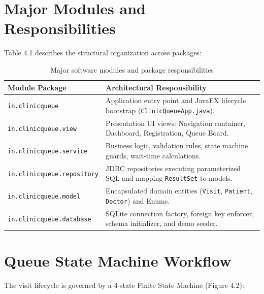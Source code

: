 \documentclass[12pt,a4paper,oneside]{report}
\begin{document}
\section{Major Modules and Responsibilities}
Table 4.1 describes the structural organization across packages:

\begin{table}[H]
\centering
\small
\begin{tabularx}{\textwidth}{p{3.2cm} X}
\toprule
\textbf{Module Package} & \textbf{Architectural Responsibility} \\
\midrule
\texttt{in.clinicqueue} & Application entry point and JavaFX lifecycle bootstrap (\texttt{ClinicQueueApp.java}). \\
\texttt{in.clinicqueue.view} & Presentation UI views: Navigation container, Dashboard, Registration, Queue Board. \\
\texttt{in.clinicqueue.service} & Business logic, validation rules, state machine guards, wait-time calculations. \\
\texttt{in.clinicqueue.repository} & JDBC repositories executing parameterized SQL and mapping \texttt{ResultSet} to models. \\
\texttt{in.clinicqueue.model} & Encapsulated domain entities (\texttt{Visit}, \texttt{Patient}, \texttt{Doctor}) and Enums. \\
\texttt{in.clinicqueue.database} & SQLite connection factory, foreign key enforcer, schema initializer, and demo seeder. \\
\bottomrule
\end{tabularx}
\caption{Major software modules and package responsibilities}
\end{table}

\section{Queue State Machine Workflow}
The visit lifecycle is governed by a 4-state Finite State Machine (Figure 4.2):
\end{document}

